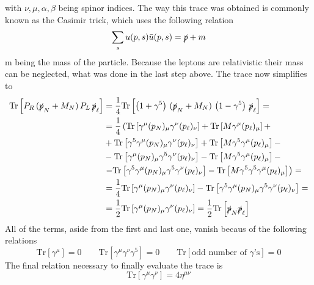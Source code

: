 with $\nu,\mu,\alpha,\beta$ being spinor indices.\newline
The way this trace was obtained is commonly known as the Casimir trick, which uses the following relation
\begin{equation*}
	\sum_s u(p,s)\bar{u}(p,s)=\slashed p +m
\end{equation*}
m being the mass of the particle. \newline
Because the leptons are relativistic their mass can be neglected, what was done in the last step above.\newline
The trace now simplifies to
\begin{align*}
	\text{Tr}\left[P_R\,(\slashed p_N+M_N)\, P_L\,\slashed p_\ell\right]&=\frac{1}{4}\text{Tr}\left[\left(1+\gamma^5\right)\,(\slashed p_N+M_N)\,\left(1-\gamma^5\right)\,\slashed p_\ell\right]=\\
	&=\frac{1}{4}\left(\text{Tr}\left[\gamma^\mu (p_N)_\mu \gamma^\nu (p_\ell)_\nu\right]+ \text{Tr}\left[M\gamma^\mu (p_\ell)_\mu\right]+\right.\\ 
	&+\text{Tr}\left[\gamma^5\gamma^\mu (p_N)_\mu\gamma^\nu (p_\ell)_\nu\right]+ \text{Tr}\left[M\gamma^5\gamma^\mu (p_\ell)_\mu\right]-\\
	 &-\text{Tr}\left[\gamma^\mu (p_N)_\mu\gamma^5\gamma^\nu (p_\ell)_\nu\right]- \text{Tr}\left[M\gamma^5\gamma^\mu (p_\ell)_\mu\right]-\\
	  &\left.-\text{Tr}\left[\gamma^5\gamma^\mu (p_N)_\mu\gamma^5\gamma^\nu (p_\ell)_\nu\right]- \text{Tr}\left[M\gamma^5\gamma^5\gamma^\mu (p_\ell)_\mu\right] \right)=\\
	&=\frac{1}{4}\text{Tr}\left[\gamma^\mu (p_N)_\mu\gamma^\nu (p_\ell)_\nu\right]-\text{Tr}\left[\gamma^5\gamma^\mu (p_N)_\mu\gamma^5\gamma^\nu (p_\ell)_\nu\right]=\\
	&=\frac{1}{2}\text{Tr}\left[\gamma^\mu (p_N)_\mu\gamma^\nu (p_\ell)_\nu\right]=\frac{1}{2}\text{Tr}\left[\slashed p_N \slashed p_\ell\right]
\end{align*}
All of the terms, aside from the first and last one, vanish becaus of the following relations
\begin{equation*}
	\text{Tr}\left[\gamma^\mu\right]=0 \qquad \text{Tr}\left[\gamma^\mu\gamma^\nu\gamma^5\right]=0\qquad \text{Tr}\left[\text{odd number of $\gamma$'s}\right]=0
\end{equation*}
The final relation necessary to finally evaluate the trace is
\begin{equation*}
	\text{Tr}[\gamma^\mu\gamma^\nu]=4\eta^{\mu\nu}
\end{equation*}
